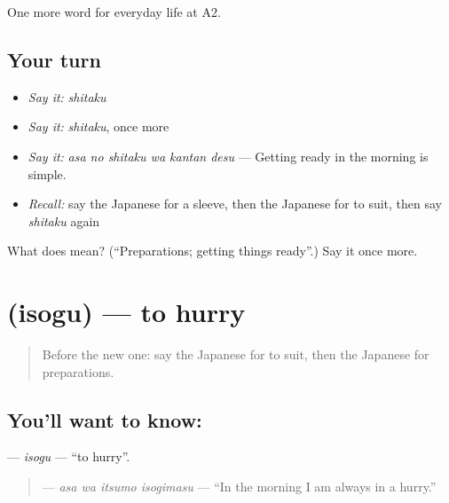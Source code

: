 \begin{grammarlens}[title={What you've built}]
One more word for everyday life at A2.
\end{grammarlens}

\subsection*{Your turn}
\begin{itemize}
\raggedright
  \item \emph{Say it:} \emph{shitaku}
  \item \emph{Say it:} \emph{shitaku}, once more
  \item \emph{Say it:} \emph{asa no shitaku wa kantan desu} — Getting ready in the morning is simple.
  \item \emph{Recall:} say the Japanese for a sleeve, then the Japanese for to suit, then say \emph{shitaku} again
\end{itemize}

\begin{tcolorbox}[breakable,colback=teal!4,colframe=teal!35!black,title={Before you move on}]
What does  mean? (\textquotedblleft{}Preparations; getting things ready\textquotedblright{}.) Say it once more.
\end{tcolorbox}
\section[\texorpdfstring{\ja{いそぐ} (isogu)}{いそぐ (isogu)}]{ (isogu) — to hurry}

\label{lesson:JA-C152-isogu}



\begin{quote}
Before the new one: say the Japanese for to suit, then the Japanese for preparations.
\end{quote}

\subsection*{You'll want to know: }
\textbf{} — \emph{isogu} — \textquotedblleft{}to hurry\textquotedblright{}.

\begin{quote}
\textbf{  } — \emph{asa wa itsumo isogimasu} — \textquotedblleft{}In the morning I am always in a hurry.\textquotedblright{}
\end{quote}


